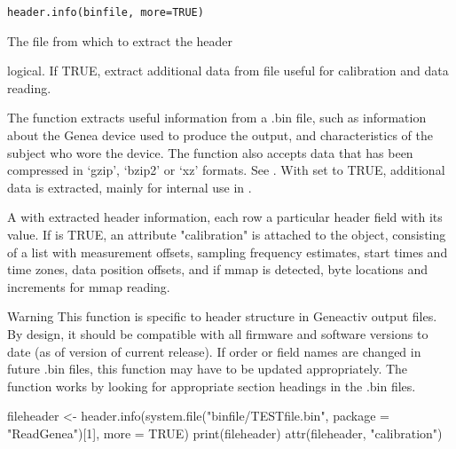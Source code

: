 \documentclass[a4paper]{book}
\begin{document}
%
\begin{Usage}
\begin{verbatim}
header.info(binfile, more=TRUE)
\end{verbatim}
\end{Usage}
%
\begin{Arguments}
\begin{ldescription}
\item[\code{binfile}] The file from which to extract the header
\item[\code{more}] logical. If TRUE, extract additional data from file useful for calibration and data reading.
\end{ldescription}
\end{Arguments}
%
\begin{Details}\relax
The function extracts useful information from a .bin file, such as information about the Genea device used to produce the output, and characteristics of the subject who wore the device. The function also accepts data that has been compressed in `gzip', `bzip2' or `xz' formats. See .
With  set to TRUE, additional data is extracted, mainly for internal use in .
\end{Details}
%
\begin{Value}
A  with extracted header information, each row a particular header field with its value. 
If  is TRUE, an attribute "calibration" is attached to the object, consisting of a list with measurement offsets, sampling frequency estimates, start times and time zones, data position offsets, and if mmap is detected, byte locations and increments for mmap reading.
\end{Value}
%
\begin{Section}{Warning}
This function is specific to header structure in Geneactiv output files. By design, it should be compatible with all firmware and software versions to date (as of version of current release). If order or field names are changed in future .bin files, this function may have to be updated appropriately.
The function works by looking for appropriate section headings in the .bin files.
\end{Section}
%
\begin{SeeAlso}\relax
{}
\end{SeeAlso}
%
\begin{Examples}
\begin{ExampleCode}

fileheader <- header.info(system.file("binfile/TESTfile.bin", package = "ReadGenea")[1], more = TRUE)
print(fileheader)
attr(fileheader, "calibration")
\end{ExampleCode}
\end{Examples}
\end{document}
